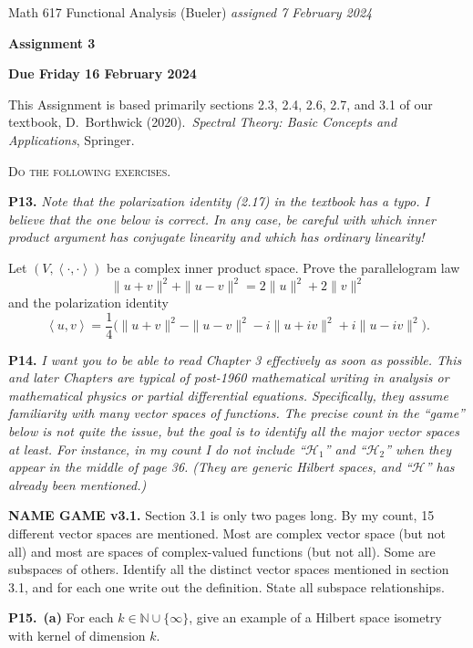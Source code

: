 \documentclass[12pt]{amsart}
\newcommand{\cH}{\mathcal{H}}
\newcommand{\NN}{\mathbb{N}}
\newcommand{\ip}[2]{\ensuremath{\left<#1,#2\right>}}
\newcommand{\prob}[1]{\bigskip\noindent\textbf{#1.}\quad }
\newcommand{\ppart}[1]{\,\textbf{(#1)}\quad }
\begin{document}
\scriptsize \noindent Math 617 Functional Analysis (Bueler) \hfill \emph{assigned 7 February 2024}
\normalsize\medskip

\Large\centerline{\textbf{Assignment 3}}
\large
\medskip

\centerline{\textbf{Due Friday 16 February 2024}}
\medskip
\normalsize

\thispagestyle{empty}

\bigskip
\noindent This Assignment is based primarily sections 2.3, 2.4, 2.6, 2.7, and 3.1 of our textbook, D.~Borthwick (2020).~\emph{Spectral Theory: Basic Concepts and Applications}, Springer.

\medskip
\noindent \textsc{Do the following exercises.}
\smallskip

\prob{P13}  \emph{Note that the polarization identity (2.17) in the textbook has a typo.  I believe that the one below is correct.  In any case, be careful with which inner product argument has conjugate linearity and which has ordinary linearity!}

\medskip
\noindent
Let $(V,\ip{\cdot}{\cdot})$ be a complex inner product space.  Prove the parallelogram law
    $$\|u+v\|^2 + \|u-v\|^2 = 2 \|u\|^2 + 2 \|v\|^2$$
and the polarization identity
    $$\ip{u}{v} = \frac{1}{4} \Big(\|u+v\|^2 - \|u-v\|^2 - i\|u+iv\|^2 + i\|u-iv\|^2\Big).$$


\prob{P14}  \emph{I want you to be able to \emph{read} Chapter 3 effectively as soon as possible.  This and later Chapters are typical of post-1960 mathematical writing in analysis or mathematical physics or partial differential equations.  Specifically, they assume familiarity with many vector spaces of functions. The precise count in the ``game'' below is not quite the issue, but the goal is to identify all the major vector spaces at least.  For instance, in my count I do not include ``$\cH_1$'' and ``$\cH_2$'' when they appear in the middle of page 36.  (They are generic Hilbert spaces, and ``$\cH$'' has already been mentioned.)}

\medskip
\noindent
\textbf{NAME GAME v3.1.}  Section 3.1 is only two pages long.  By my count, 15 different vector spaces are mentioned.  Most are complex vector space (but not all) and most are spaces of complex-valued functions (but not all).  Some are subspaces of others.  Identify all the distinct vector spaces mentioned in section 3.1, and for each one write out the definition.  State all subspace relationships.


\prob{P15}  \ppart{a} For each $k\in \NN \cup\{\infty\}$, give an example of a Hilbert space isometry with kernel of dimension $k$.
\end{document}
